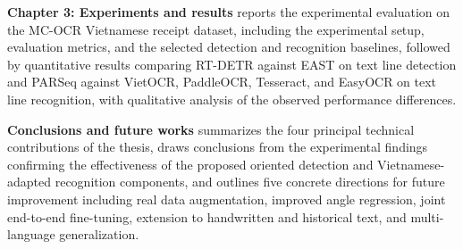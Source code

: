 \textbf{Chapter 3: Experiments and results} reports the experimental evaluation on the MC-OCR Vietnamese receipt dataset, including the experimental setup, evaluation metrics, and the selected detection and recognition baselines, followed by quantitative results comparing RT-DETR against EAST on text line detection and PARSeq against VietOCR, PaddleOCR, Tesseract, and EasyOCR on text line recognition, with qualitative analysis of the observed performance differences.

\textbf{Conclusions and future works} summarizes the four principal technical contributions of the thesis, draws conclusions from the experimental findings confirming the effectiveness of the proposed oriented detection and Vietnamese-adapted recognition components, and outlines five concrete directions for future improvement including real data augmentation, improved angle regression, joint end-to-end fine-tuning, extension to handwritten and historical text, and multi-language generalization.
